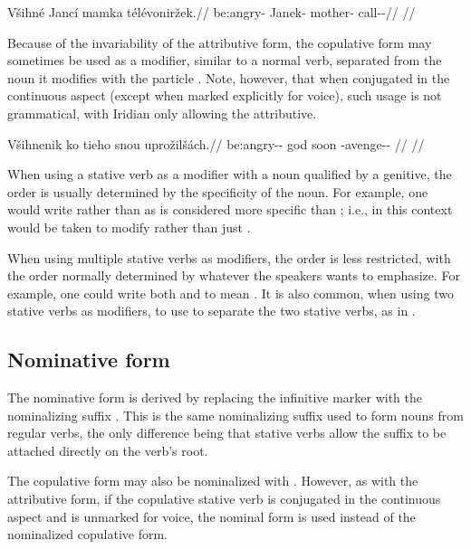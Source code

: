 \ex
\begingl
\gla Všihné Jancí mamka télévoniržek.//
\glb be:angry-\Att{} Janek-\Gen{} mother-\Dim{} call-\Av{}-\Pf{}//
\glft {}//
\endgl
\xe

Because of the invariability of the attributive form, the copulative form may
sometimes be used as a modifier, similar to a normal verb, separated from the
noun it modifies with the particle . Note, however, that when conjugated
in the continuous aspect (except when marked explicitly for voice), such usage
is not grammatical, with Iridian only allowing the attributive.

\ex
\begingl
\gla Všihnenik ko tieho snou uprožilšách.//
\glb be:angry-\Pv{}-\Pf{} \Att{} god soon \Refl{}-avenge-\Av{}-\Ctp{} //
\glft {}//
\endgl
\xe

When using a stative verb as a modifier with a noun qualified by a genitive, the
order is usually determined by the specificity of the noun. For example, one
would write  rather than
 as  is considered more specific than
; i.e., in this context  would be taken to modify
 rather than just .

When using multiple stative verbs as modifiers, the order is less restricted,
with the order normally determined by whatever the speakers wants to emphasize.
For example, one could write both  and  to mean . It is also common, when using two
stative verbs as modifiers, to use  to separate the two stative
verbs, as in .

\subsection{Nominative form}
The nominative form is derived by replacing the infinitive marker  with
the nominalizing suffix . This is the same nominalizing suffix used to
form nouns from regular verbs, the only difference being that stative verbs
allow the suffix to be attached directly on the verb's root.

The copulative form may also be nominalized with .
 However, as with the attributive form, if the copulative
stative verb is conjugated in the continuous aspect and is unmarked for voice,
the nominal form is used instead of the nominalized copulative form.
